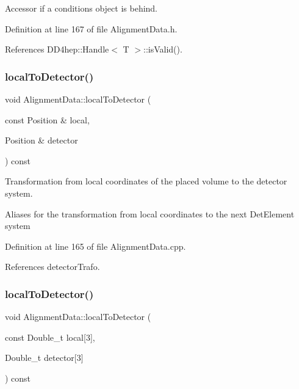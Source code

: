 Accessor if a conditions object is behind. 



Definition at line 167 of file Alignment\+Data.\+h.



References D\+D4hep\+::\+Handle$<$ T $>$\+::is\+Valid().

\hypertarget{class_d_d4hep_1_1_alignments_1_1_alignment_data_a10d03e4422709e54e030a04836f3c08d}{}\label{class_d_d4hep_1_1_alignments_1_1_alignment_data_a10d03e4422709e54e030a04836f3c08d} 
\subsubsection{\texorpdfstring{local\+To\+Detector()}{localToDetector()}\hspace{0.1cm}{\footnotesize\ttfamily [1/4]}}
{\footnotesize\ttfamily void Alignment\+Data\+::local\+To\+Detector (\begin{DoxyParamCaption}\item[{const Position \&}]{local,  }\item[{Position \&}]{detector }\end{DoxyParamCaption}) const}



Transformation from local coordinates of the placed volume to the detector system. 

Aliases for the transformation from local coordinates to the next Det\+Element system 

Definition at line 165 of file Alignment\+Data.\+cpp.



References detector\+Trafo.

\hypertarget{class_d_d4hep_1_1_alignments_1_1_alignment_data_adc80cc9962e0e6209f0c7b9725123d94}{}\label{class_d_d4hep_1_1_alignments_1_1_alignment_data_adc80cc9962e0e6209f0c7b9725123d94} 
\subsubsection{\texorpdfstring{local\+To\+Detector()}{localToDetector()}\hspace{0.1cm}{\footnotesize\ttfamily [2/4]}}
{\footnotesize\ttfamily void Alignment\+Data\+::local\+To\+Detector (\begin{DoxyParamCaption}\item[{const Double\+\_\+t}]{local\mbox{[}3\mbox{]},  }\item[{Double\+\_\+t}]{detector\mbox{[}3\mbox{]} }\end{DoxyParamCaption}) const}



